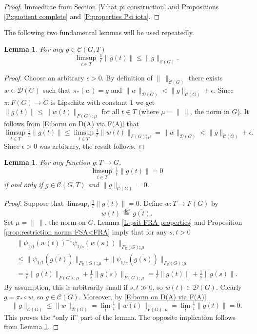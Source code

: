\documentclass[12pt]{amsart}
\newtheorem{lemma}[prop]{Lemma}
\theoremstyle{definition}
\def\RR{\ensuremath{\mathbb{R}}}
\newcommand{\C}[1]{\mathcal{#1}}
\def\Free{F}
\begin{document}
\begin{proof}
Immediate from Section \ref{V:hat pi construction} and Propositions  \ref{P:quotient complete} and  \ref{P:properties Psi iota}.
\end{proof}





The following two fundamental lemmas will be used repeatedly.



\begin{lemma}\label{L:limsup<norm}
For any $g \in \C C(G,T)$
\[
\limsup_{t \in T} \, \tfrac{1}{t} \| g(t)\| \leq \| g \|_{\C C(G)}.
\]
\end{lemma}

\begin{proof}
Choose an arbitrary $\epsilon>0$.
By definition of $\| \ \|_{\C C(G)}$ there exists $w \in \C D(G)$ such that $\pi_*(w)=g$ and $\|w\|_{\C D(G)} < \|g\|_{\C C(G)} + \epsilon$.
Since $\pi \colon \Free(G) \to G$ is Lipschitz with constant $1$ we get  $\|g(t)\| \leq \|w(t)\|_{\Free(G);\mu}$ for all $t\in T$ (where $\mu = \| \ \|$, the norm in $G$).
It follows from \eqref{E:borm on D(A) via F(A)} that
\[
\limsup_{t \in T} \tfrac{1}{t} \|g(t)\| \leq \limsup_{t \in T} \tfrac{1}{t} \|w(t)\|_{\Free(G);\mu}
= \|w\|_{\C D(G)} 
< \|g\|_{\C C(G)}+ \epsilon.
\]
Since $\epsilon>0$ was arbitrary, the result follows.
\end{proof}





\begin{lemma}\label{L:characterize norm 0 in C}
For any function $g \colon T \to G$,
\[
\limsup_{t \in T} \, \tfrac{1}{t} \|g(t)\| =0
\] 
if and only if $g \in \C C(G,T)$ and $\|g\|_{\C C(G)}=0$.
\end{lemma}

\begin{proof}
Suppose that $\limsup_t \tfrac{1}{t} \|g(t)\| =0$.
Define $w \colon T \to \Free(G)$ by 
\[
w(t) \, \overset{\text{def}}{=} \, \overline{g(t)}.
\]
Set $\mu = \| \ \|$, the norm on $G$.
Lemma \ref{L:psit FRA properties} and Proposition \ref{prop:restriction norms FSA<FRA} imply that for any $s,t>0$
\begin{multline*}
\| \psi_{1/t}(w(t))^{-1} \psi_{1/s}(w(s))\|_{\Free_\RR(G);\mu} 
\\
\leq
\|\psi_{1/t}(\overline{g(t)})\|_{\Free_\RR(G);\mu} + \|\psi_{1/s}(\overline{g(s)})\|_{\Free_\RR(G);\mu} 
\\
=
\tfrac{1}{t}\|\overline{g(t)}\|_{\Free(G);\mu} + \tfrac{1}{s}\|\overline{g(s)}\|_{\Free(G);\mu} =
\tfrac{1}{t}\|g(t)\| + \tfrac{1}{s}\|g(s)\|.
\end{multline*}
By assumption, this is arbitrarily small if $s,t \gg 0$, so $w(t) \in \C D(G)$.
Clearly $g=\pi_* \circ w$, so $g \in \C C(G)$.
Moreover, by \eqref{E:borm on D(A) via F(A)}
\[
\| g \|_{\C C(G)} \leq \|w\|_{\C D(G)} = \lim_t \tfrac{1}{t} \|w(t)\|_{\Free(G);\mu} = \lim_t \tfrac{1}{t} \|g(t)\| =0.
\]
This proves the ``only if'' part of the lemma.
The opposite implication follows  from Lemma \ref{L:limsup<norm}.
\end{proof}
\end{document}

